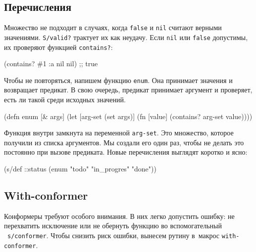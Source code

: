 \subsection{Перечисления}


Множество не подходит в случаях, когда \verb|false| и \verb|nil| считают
верными значениями. \verb|S/valid?| трактует их как неудачу. Если \verb|nil|
или \verb|false| допустимы, их проверяют функцией \verb|contains?|:

\begin{english}
  \begin{clojure}
(contains? #{1 :a nil} nil) ;; true
  \end{clojure}
\end{english}

Чтобы не повторяться, напишем функцию \verb|enum|. Она принимает значения и
возвращает предикат. В свою очередь, предикат принимает аргумент и проверяет,
есть ли такой среди исходных значений.

\begin{english}
  \begin{clojure}
(defn enum [& args]
  (let [arg-set (set args)]
    (fn [value]
      (contains? arg-set value))))
  \end{clojure}
\end{english}

Функция внутри замкнута на переменной \verb|arg-set|. Это множество, которое
получили из списка аргументов. Мы создали его один раз, чтобы не делать это
постоянно при вызове предиката. Новые перечисления выглядят коротко и ясно:

\begin{english}
  \begin{clojure}
(s/def ::status
  (enum "todo"
        "in_progres"
        "done"))
  \end{clojure}
\end{english}

\subsection{With-conformer}


Конформеры требуют особого внимания. В них легко допустить ошибку: не
перехватить исключение или не обернуть функцию во вспомогательный
~\verb|s/conformer|. Чтобы снизить риск ошибки, вынесем рутину в~макрос
\verb|with-conformer|.

